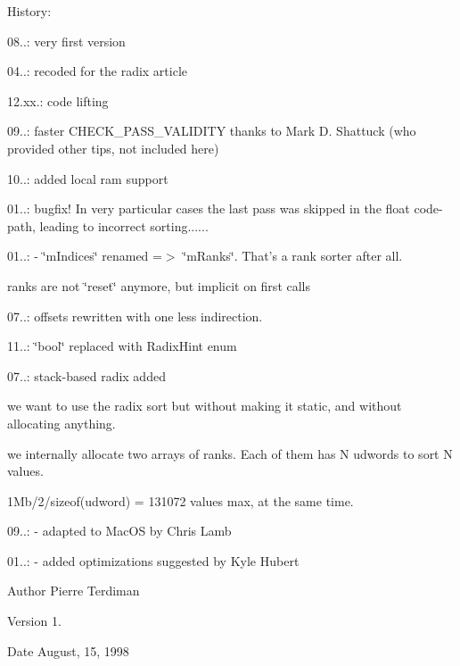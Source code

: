 History\+:
\begin{DoxyItemize}
\item 08..\+: very first version
\item 04..\+: recoded for the radix article
\item 12.\+xx.\+: code lifting
\item 09..\+: faster C\+H\+E\+C\+K\+\_\+\+P\+A\+S\+S\+\_\+\+V\+A\+L\+I\+D\+I\+T\+Y thanks to Mark D. Shattuck (who provided other tips, not included here)
\item 10..\+: added local ram support
\item 01..\+: bugfix! In very particular cases the last pass was skipped in the float code-\/path, leading to incorrect sorting......
\item 01..\+: -\/ \char`\"{}m\+Indices\char`\"{} renamed =$>$ \char`\"{}m\+Ranks\char`\"{}. That's a rank sorter after all.
\begin{DoxyItemize}
\item ranks are not \char`\"{}reset\char`\"{} anymore, but implicit on first calls
\end{DoxyItemize}
\item 07..\+: offsets rewritten with one less indirection.
\item 11..\+: \char`\"{}bool\char`\"{} replaced with Radix\+Hint enum
\item 07..\+: stack-\/based radix added
\begin{DoxyItemize}
\item we want to use the radix sort but without making it static, and without allocating anything.
\item we internally allocate two arrays of ranks. Each of them has N udwords to sort N values.
\item 1\+Mb/2/sizeof(udword) = 131072 values max, at the same time.
\end{DoxyItemize}
\item 09..\+: -\/ adapted to Mac\+O\+S by Chris Lamb
\item 01..\+: -\/ added optimizations suggested by Kyle Hubert
\end{DoxyItemize}

\begin{DoxyAuthor}{Author}
Pierre Terdiman 
\end{DoxyAuthor}
\begin{DoxyVersion}{Version}
1. 
\end{DoxyVersion}
\begin{DoxyDate}{Date}
August, 15, 1998 
\end{DoxyDate}


